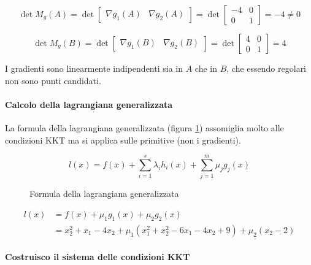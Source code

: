 \documentclass[\main/main.tex]{subfiles}
\begin{document}
\[
	\det M_g(A) = \det\begin{bmatrix}\nabla g_1(A) & \nabla g_2(A)\end{bmatrix}= \det\begin{bmatrix}
		-4 & 0 \\
		0  & 1
	\end{bmatrix}
	= -4 \neq 0
\]

\[
	\det M_g(B) = \det\begin{bmatrix}\nabla g_1(B) & \nabla g_2(B)\end{bmatrix}= \det\begin{bmatrix}
		4 & 0 \\
		0 & 1
	\end{bmatrix}
	= 4
\]


I gradienti sono linearmente indipendenti sia in $A$ che in $B$, che essendo regolari non sono punti candidati.

\paragraph*{Calcolo della lagrangiana generalizzata}
La formula della lagrangiana generalizzata (figura \ref{lagrangiana_generalizzata}) assomiglia molto alle condizioni KKT ma si applica sulle primitive (non i gradienti).

\begin{figure}
	\[
		l(x) = f(x) + \sum_{i=1}^s \lambda_i h_i(x) + \sum_{j=1}^m \mu_j g_j(x)
	\]
	\caption{Formula della lagrangiana generalizzata}
	\label{lagrangiana_generalizzata}
\end{figure}

\begin{align*}
	l(x) & = f(x) + \mu_1 g_1(x) + \mu_2 g_2(x)                               \\
	     & = x^2_2+x_1-4x_2 + \mu_1 (x^2_1+x^2_2-6x_1-4x_2+9) + \mu_2 (x_2-2)
\end{align*}

\paragraph*{Costruisco il sistema delle condizioni KKT}
\end{document}
